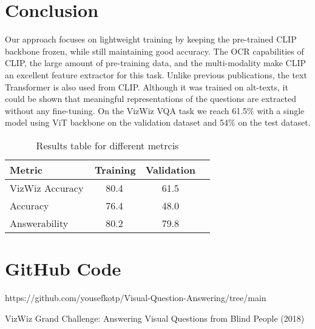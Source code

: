 \documentclass[final,5p,times,twocolumn,authoryear]{elsarticle}
\begin{document}
\section{Conclusion}

Our approach focuses on lightweight training by keeping the pre-trained CLIP backbone frozen, while still maintaining good accuracy. The OCR capabilities of CLIP, the large amount of pre-training data, and the multi-modality make CLIP an excellent feature extractor for this task. Unlike previous publications, the text Transformer is also used from CLIP. Although it was trained on alt-texts, it could be shown that meaningful representations of the questions are extracted without any fine-tuning. On the VizWiz VQA task we reach 61.5\% with a single model using ViT backbone on the validation dataset and 54\% on the test dataset.
\begin{table}
\begin{tabular}{l c c c} 
 \hline
 Metric & Training & Validation & \\
 \hline
 VizWiz Accuracy\, & 	80.4\, & 61.5 \\
 Accuracy\, & 76.4\, & 48.0 \\
 Answerability\, & 80.2\, & 79.8 \\
 \hline
\end{tabular}

\caption{Results table for different metrcis}

\label{Table1}
\end{table}


\appendix

\section{GitHub Code}
\label{this is amazing}
https://github.com/yousefkotp/Visual-Question-Answering/tree/main


 


\begin{thebibliography}{00}

 VizWiz Grand Challenge: Answering Visual Questions from Blind People (2018)


\end{thebibliography}
\end{document}
